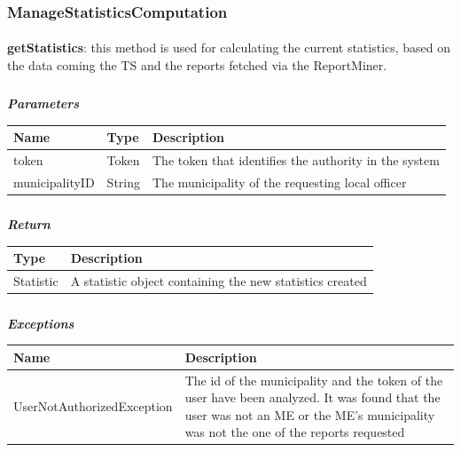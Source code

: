 				\subsubsection{ManageStatisticsComputation}
					\paragraph{}
							\textbf{getStatistics}: this method is used for calculating the current statistics, based on the data coming the TS and the reports fetched via the ReportMiner.
							\subparagraph{}
							\textit{\textbf{Parameters}}
								\begin{table}[!h]
									\begin{tabular}{L{0.2\textwidth}L{0.2\textwidth}L{0.2\textwidth}}
										\toprule
										Name & Type & Description \\
										\midrule
								  		token & Token & The token that identifies the authority in the system \\
								  		municipalityID & String & The municipality of the requesting local officer \\
								 		\bottomrule
									\end{tabular}
								\end{table}
							\subparagraph{}
								\textit{\textbf{Return}}
									\begin{table}[!h]
									\begin{tabular}{L{0.3\textwidth}L{0.3\textwidth}}
										\toprule
										Type & Description \\
										\midrule
								  		Statistic & A statistic object containing the new statistics created \\
								 		\bottomrule
									\end{tabular}
								\end{table}
							\subparagraph{}
								\textit{\textbf{Exceptions}}
									\begin{table}[!h]
									\begin{tabular}{L{0.3\textwidth}L{0.3\textwidth}}
										\toprule
										Name & Description \\
										\midrule
								  	UserNotAuthorizedException & The id of the municipality and the token of the user have been analyzed. It was found that the user was not an ME or the ME's  municipality was not the one of the reports requested  \\
								 		\bottomrule
									\end{tabular}
								\end{table}

